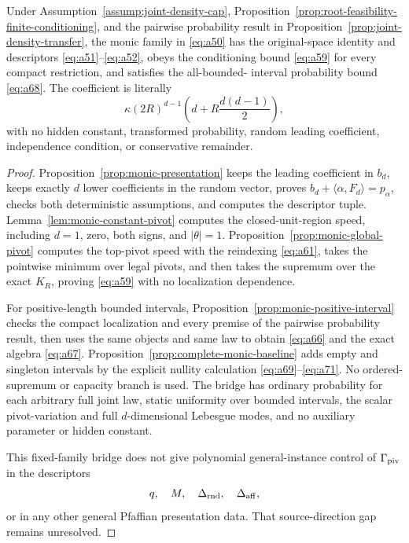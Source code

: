 \begin{proposition}
\label{prop:exact-monic-recovery}
Under Assumption~\ref{assump:joint-density-cap},
Proposition~\ref{prop:root-feasibility-finite-conditioning}, and the
pairwise probability result in Proposition~\ref{prop:joint-density-transfer},
the monic family in \eqref{eq:a50} has the original-space identity and
descriptors \eqref{eq:a51}--\eqref{eq:a52}, obeys the conditioning bound
\eqref{eq:a59} for every compact restriction, and satisfies the all-bounded-
interval probability bound \eqref{eq:a68}.  The coefficient is literally
\[
\kappa(2R)^{d-1}\left(d+R\frac{d(d-1)}2\right),
\]
with no hidden constant, transformed probability, random leading
coefficient, independence condition, or conservative remainder.
\end{proposition}

\begin{proof}
Proposition~\ref{prop:monic-presentation} keeps the leading coefficient in
$b_d$, keeps exactly $d$ lower coefficients in the random vector, proves
$b_d+\langle\alpha,F_d\rangle=p_\alpha$, checks both deterministic
assumptions, and computes the descriptor tuple.  Lemma~\ref{lem:monic-constant-pivot}
computes the closed-unit-region speed, including $d=1$, zero, both signs,
and $|\theta|=1$.  Proposition~\ref{prop:monic-global-pivot} computes the
top-pivot speed with the reindexing \eqref{eq:a61}, takes the pointwise
minimum over legal pivots, and then takes the supremum over the exact
$K_R$, proving \eqref{eq:a59} with no localization dependence.

For positive-length bounded intervals,
Proposition~\ref{prop:monic-positive-interval} checks the compact
localization and every premise of the pairwise probability result, then
uses the same objects and same law to obtain \eqref{eq:a66} and the exact
algebra \eqref{eq:a67}.  Proposition~\ref{prop:complete-monic-baseline}
adds empty and singleton intervals by the explicit nullity calculation
\eqref{eq:a69}--\eqref{eq:a71}.  No ordered-supremum or capacity branch is
used.  The bridge has ordinary probability for each arbitrary full joint
law, static uniformity over bounded intervals, the scalar pivot-variation
and full $d$-dimensional Lebesgue modes, and no auxiliary parameter or
hidden constant.

This fixed-family bridge does not give polynomial general-instance control
of $\Gamma_{\rm piv}$ in the descriptors
\[
q,\quad M,\quad\Delta_{\rm rnd},\quad\Delta_{\rm aff},
\]
or in any other general Pfaffian presentation data.  That source-direction
gap remains unresolved.
\end{proof}

